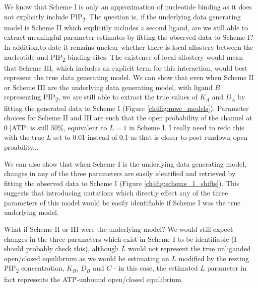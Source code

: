 We know that Scheme I is only an approximation of nucleotide binding as it does not explicitly include PIP\textsubscript{2}.
The question is, if the underlying data generating model is Scheme II which explicitly includes a second ligand, are we still able to extract meaningful parameter estimates by fitting the observed data to Scheme I?
In addition,to date it remains unclear whether there is local allostery between the nucleotide and PIP\textsubscript{2} binding sites.
The existence of local allostery would mean that Scheme III, which includes an explicit term for this interaction, would best represent the true data generating model.
We can show that even when Scheme II or Scheme III are the underlying data generating model, with ligand $B$ representing PIP\textsubscript{2}, we are still able to extract the true values of $K_A$ and $D_A$ by fitting the generated data to Scheme I (Figure \ref{ch4fig:mwc_models}).
Parameter choices for Scheme II and III are such that the open probability of the channel at 0 [ATP] is still 50\%, equivalent to $L=1$ in Scheme I.
I really need to redo this with the true $L$ set to $0.01$ instead of $0.1$ as that is closer to post rundown open proability...

We can also show that when Scheme I is the underlying data generating model, changes in any of the three parameters are easily identified and retrieved by fitting the observed data to Scheme I (Figure \ref{ch4fig:scheme_1_shifts}).
This suggests that introducing mutations which directly effect any of the three parameters of this model would be easily identifiable if Scheme I was the true underlying model.

What if Scheme II or III were the underlying model?
We would still expect changes in the three parameters which exist in Scheme I to be identifiable (I should probably check this), although $L$ would not represent the true unliganded open/closed equilibrium as we would be estimating an $L$ modified by the resting PIP\textsubscript{2} concentration, $K_B$, $D_B$ and $C$ - in this case, the estimated $L$ parameter in fact represents the ATP-unbound open/closed equilibrium.

